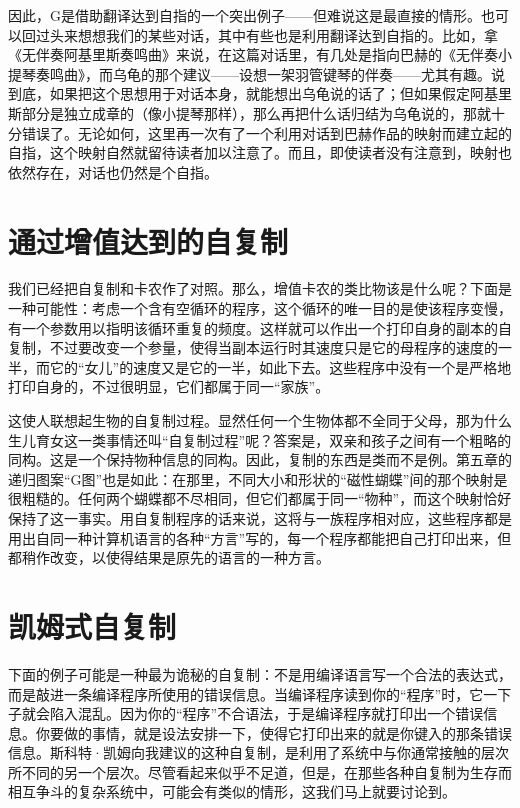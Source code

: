 因此，G是借助翻译达到自指的一个突出例子——但难说这是最直接的情形。也可以回过头来想想我们的某些对话，其中有些也是利用翻译达到自指的。比如，拿《无伴奏阿基里斯奏鸣曲》来说，在这篇对话里，有几处是指向巴赫的《无伴奏小提琴奏鸣曲》，而乌龟的那个建议——设想一架羽管键琴的伴奏——尤其有趣。说到底，如果把这个思想用于对话本身，就能想出乌龟说的话了；但如果假定阿基里斯部分是独立成章的（像小提琴那样），那么再把什么话归结为乌龟说的，那就十分错误了。无论如何，这里再一次有了一个利用对话到巴赫作品的映射而建立起的自指，这个映射自然就留待读者加以注意了。而且，即使读者没有注意到，映射也依然存在，对话也仍然是个自指。

\section{通过增值达到的自复制}

我们已经把自复制和卡农作了对照。那么，增值卡农的类比物该是什么呢？下面是一种可能性：考虑一个含有空循环的程序，这个循环的唯一目的是使该程序变慢，有一个参数用以指明该循环重复的频度。这样就可以作出一个打印自身的副本的自复制，不过要改变一个参量，使得当副本运行时其速度只是它的母程序的速度的一半，而它的“女儿”的速度又是它的一半，如此下去。这些程序中没有一个是严格地打印自身的，不过很明显，它们都属于同一“家族”。

这使人联想起生物的自复制过程。显然任何一个生物体都不全同于父母，那为什么生儿育女这一类事情还叫“自复制过程”呢？答案是，双亲和孩子之间有一个粗略的同构。这是一个保持物种信息的同构。因此，复制的东西是类而不是例。第五章的递归图案“G图”也是如此：在那里，不同大小和形状的“磁性蝴蝶”间的那个映射是很粗糙的。任何两个蝴蝶都不尽相同，但它们都属于同一“物种”，而这个映射恰好保持了这一事实。用自复制程序的话来说，这将与一族程序相对应，这些程序都是用出自同一种计算机语言的各种“方言”写的，每一个程序都能把自己打印出来，但都稍作改变，以使得结果是原先的语言的一种方言。

\section{凯姆式自复制}

下面的例子可能是一种最为诡秘的自复制：不是用编译语言写一个合法的表达式，而是敲进一条编译程序所使用的错误信息。当编译程序读到你的“程序”时，它一下子就会陷入混乱。因为你的“程序”不合语法，于是编译程序就打印出一个错误信息。你要做的事情，就是设法安排一下，使得它打印出来的就是你键入的那条错误信息。斯科特·凯姆向我建议的这种自复制，是利用了系统中与你通常接触的层次所不同的另一个层次。尽管看起来似乎不足道，但是，在那些各种自复制为生存而相互争斗的复杂系统中，可能会有类似的情形，这我们马上就要讨论到。

